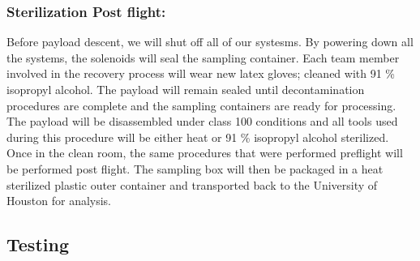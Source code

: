\subsubsection{Sterilization Post flight:}
Before payload descent, we will shut off all of our systesms. By powering down all the systems, the solenoids will seal the sampling container. Each team member involved in the recovery process will wear new latex gloves; cleaned with 91 \% isopropyl alcohol. The payload will remain sealed until decontamination procedures are complete and the sampling containers are ready for processing. The payload will be disassembled under class 100 conditions and all tools used during this procedure will be either heat or 91 \% isopropyl alcohol sterilized. Once in the clean room, the same procedures that were performed preflight will be performed post flight. The sampling box will then be packaged in a heat sterilized plastic outer container and transported back to the University of Houston for analysis.


\subsection{Testing}

